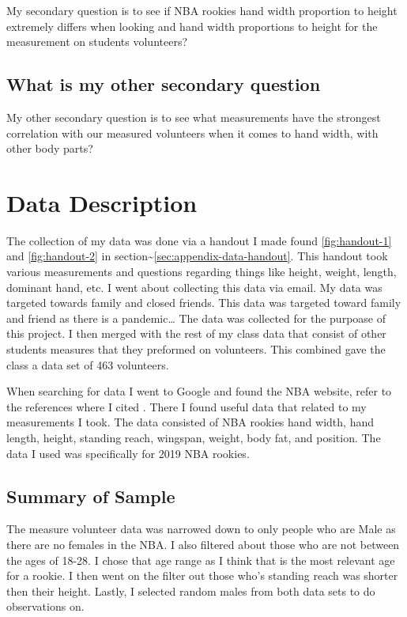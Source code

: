 \documentclass[]{article}
\begin{document}
My secondary question is to see if NBA rookies hand width proportion to
height extremely differs when looking and hand width proportions to
height for the measurement on students volunteers?

\subsection{What is my other secondary question}
\label{sec:rq3}

My other secondary question is to see what measurements have the
strongest correlation with our measured volunteers when it comes to hand
width, with other body parts?

\section{Data Description}
\label{sec:data}

The collection of my data was done via a handout I made found
\ref{fig:handout-1} and \ref{fig:handout-2} in
section\textasciitilde{}\ref{sec:appendix-data-handout}. This handout
took various measurements and questions regarding things like height,
weight, length, dominant hand, etc. I went about collecting this data
via email. My data was targeted towards family and closed friends. This
data was targeted toward family and friend as there is a
pandemic\ldots{} The data was collected for the purpoase of this
project. I then merged with the rest of my class data that consist of
other students measures that they preformed on volunteers. This combined
gave the class a data set of 463 volunteers. \newline

\noindent When searching for data I went to Google and found the NBA
website, refer to the references where I cited \citet{NBAdata}. There I
found useful data that related to my measurements I took. The data
consisted of NBA rookies hand width, hand length, height, standing
reach, wingspan, weight, body fat, and position. The data I used was
specifically for 2019 NBA rookies.

\subsection{Summary of Sample}
\label{sec:data-sample}

The measure volunteer data was narrowed down to only people who are Male
as there are no females in the NBA. I also filtered about those who are
not between the ages of 18-28. I chose that age range as I think that is
the most relevant age for a rookie. I then went on the filter out those
who's standing reach was shorter then their height. Lastly, I selected
random males from both data sets to do observations on.
\end{document}
